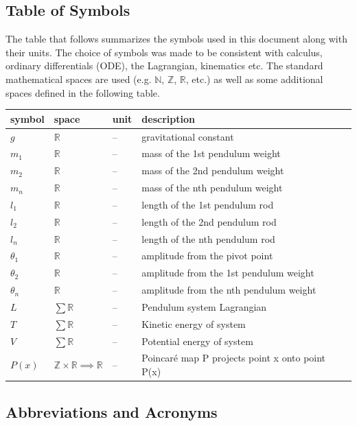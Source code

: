 \documentclass[12pt]{article}
\begin{document}
\newpage

\subsection{Table of Symbols}

The table that follows summarizes the symbols used in this document along with
their units. The choice of symbols was made to be consistent with calculus,
ordinary
differentials (ODE), the Lagrangian, kinematics etc. The standard mathematical
spaces
are used (e.g. $\mathbb{N}$, $\mathbb{Z}$, $\mathbb{R}$, etc.) as well as some 
additional spaces defined in the following table. 
~\newline
\renewcommand{\arraystretch}{1.2}
\noindent \begin{longtable*}{l l l p{8cm}} \toprule
\textbf{symbol} & \textbf{space} & \textbf{unit} & \textbf{description}\\
\midrule 
$g$ & $\mathbb{R}$ & -- & gravitational constant
\\
$m_1$ & $\mathbb{R}$ & -- & mass of the 1st pendulum weight
\\ 
$m_2$ & $\mathbb{R}$ & -- & mass of the 2nd pendulum weight
\\ 
$m_n$ & $\mathbb{R}$ & -- & mass of the nth pendulum weight
\\ 
$l_1$ & $\mathbb{R}$ & -- & length of the 1st pendulum rod
\\ 
$l_2$ & $\mathbb{R}$ & -- & length of the 2nd pendulum rod
\\ 
$l_n$ & $\mathbb{R}$ & -- & length of the nth pendulum rod
\\
$\theta_1$ & $\mathbb{R}$ & -- & amplitude from the pivot point
\\
$\theta_2$ & $\mathbb{R}$ & -- & amplitude from the 1st pendulum weight
\\
$\theta_n$ & $\mathbb{R}$ & -- & amplitude from the nth pendulum weight
\\
$L$ & $\sum\mathbb{R}$ & -- & Pendulum system Lagrangian
\\
$T$ & $\sum\mathbb{R}$ & -- & Kinetic energy of system
\\
$V$ & $\sum\mathbb{R}$ & -- & Potential energy of system
\\
$P(x)$ & $\mathbb{Z} \times \mathbb{R} \implies \mathbb{R}$ & -- & Poincaré map P projects point x onto point P(x)
\\
\bottomrule
\end{longtable*}

\newpage
\subsection{Abbreviations and Acronyms}
\end{document}
